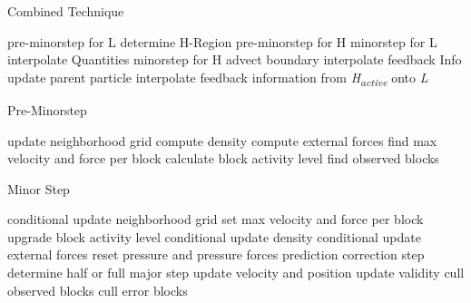 \documentclass[../../main.tex]{subfiles}
\begin{document}
\label{la:1}
\label{la:2}
\label{la:3}
\label{la:4}

\begin{algorithm}
    \caption{Combined Technique}
    \label{alg:twoscale}
    \begin{algorithmic}[1]
            \State pre-minorstep for L
            \State determine H-Region
            \State pre-minorstep for H
                \State minorstep for L
                \State interpolate Quantities
                  \State minorstep for H
                  \State advect boundary
                \EndFor
            \State interpolate feedback Info
            \EndFor
            \State update parent particle
            \State interpolate feedback information from \textit{{\texorpdfstring{H\textsubscript{active}}{H active}}} onto \textit{L}
        \EndWhile
   \end{algorithmic}
\end{algorithm}

\begin{algorithm}
    \caption{Pre-Minorstep}
    \label{alg:twoscale}
    \begin{algorithmic}[1]
    \State update neighborhood grid
    \State compute density
    \State compute external forces
    \State find max velocity and force per block
    \State calculate block activity level
    \State find observed blocks
   \end{algorithmic}
\end{algorithm}

\begin{algorithm}
    \caption{Minor Step}
    \label{alg:twoscale}
    \begin{algorithmic}[1]
        \State conditional update neighborhood grid 
    \EndIf 
    \State set max velocity and force per block
    \State upgrade block activity level
        \State conditional update density 
        \State conditional update external forces 
    \EndIf 
    \State reset pressure and pressure forces
    \State prediction correction step
    \State determine half or full major step
    \State update velocity and position
    \State update validity
    \State cull observed blocks
	\State cull error blocks
   \end{algorithmic}
\end{algorithm}
\end{document}
